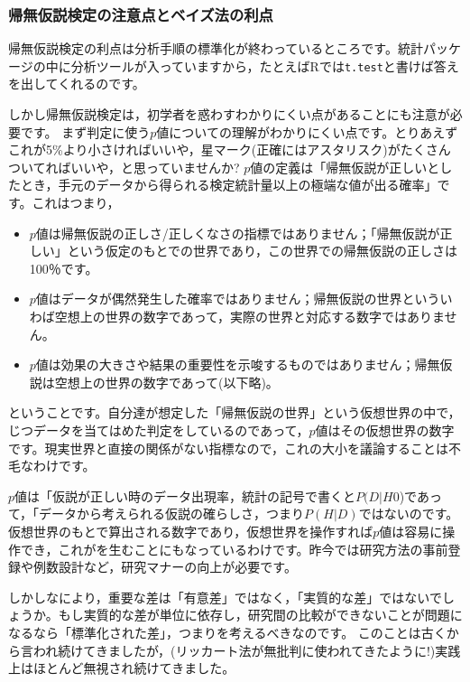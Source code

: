 \documentclass{ltjsbook}
\begin{document}
\subsubsection{帰無仮説検定の注意点とベイズ法の利点}
帰無仮説検定の利点は分析手順の標準化が終わっているところです。統計パッケージの中に分析ツールが入っていますから，たとえばRでは\verb|t.test|と書けば答えを出してくれるのです。

しかし帰無仮説検定は，初学者を惑わすわかりにくい点があることにも注意が必要です。
まず判定に使う$p$値についての理解がわかりにくい点です。とりあえずこれが5\%より小さければいいや，星マーク(正確にはアスタリスク)がたくさんついてればいいや，と思っていませんか?
$p$値の定義は「帰無仮説が正しいとしたとき，手元のデータから得られる検定統計量以上の極端な値が出る確率」です。これはつまり，
\begin{itemize}
	\item $p$値は帰無仮説の正しさ/正しくなさの指標ではありません；「帰無仮説が正しい」という仮定のもとでの世界であり，この世界での帰無仮説の正しさは100％です。
	\item $p$値はデータが偶然発生した確率ではありません；帰無仮説の世界といういわば空想上の世界の数字であって，実際の世界と対応する数字ではありません。
	\item $p$値は効果の大きさや結果の重要性を示唆するものではありません；帰無仮説は空想上の世界の数字であって(以下略)。
\end{itemize}
ということです。自分達が想定した「帰無仮説の世界」という仮想世界の中で，じつデータを当てはめた判定をしているのであって，$p$値はその仮想世界の数字です。現実世界と直接の関係がない指標なので，これの大小を議論することは不毛なわけです。

$p$値は「仮説が正しい時のデータ出現率，統計の記号で書くと$P(D|H0$)であって，「データから考えられる仮説の確らしさ，つまり$P(H|D)$ではないのです。仮想世界のもとで算出される数字であり，仮想世界を操作すれば$p$値は容易に操作でき，これがを生むことにもなっているわけです。昨今では研究方法の事前登録や例数設計など，研究マナーの向上が必要です。

しかしなにより，重要な差は「有意差」ではなく，「実質的な差」ではないでしょうか。もし実質的な差が単位に依存し，研究間の比較ができないことが問題になるなら「標準化された差」，つまりを考えるべきなのです。
このことは古くから言われ続けてきましたが，(リッカート法が無批判に使われてきたように!)実践上はほとんど無視され続けてきました。
\end{document}
